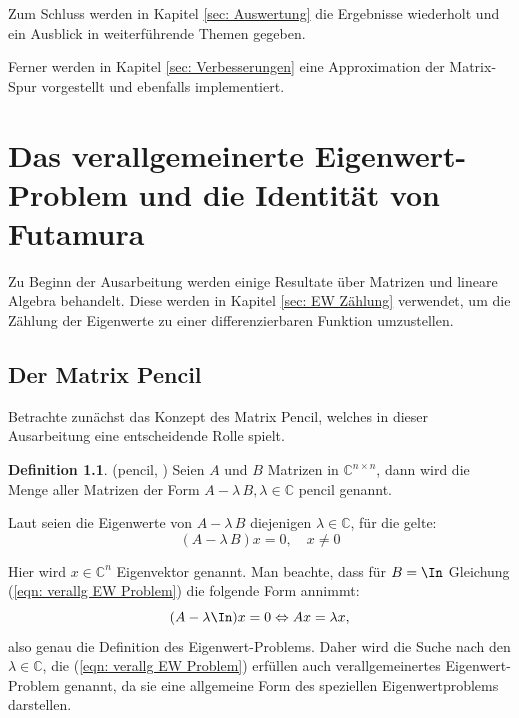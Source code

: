 \documentclass[ngerman,BCOR=4mm]{tudscrreprt}
\newcommand{\C}{\mathbb C}
\newcommand{\AlamB}{A-\lambda\,B}
\theoremstyle{plain} %
\theoremstyle{definition} %
\newtheorem{definition}[theorem]{Definition}
\theoremstyle{remark}
\begin{document}
      Zum Schluss werden in Kapitel \ref{sec: Auswertung} die Ergebnisse wiederholt und ein Ausblick in weiterführende Themen gegeben.

      Ferner werden in Kapitel \ref{sec: Verbesserungen} eine Approximation der Matrix-Spur vorgestellt und ebenfalls implementiert.

\chapter{Das verallgemeinerte Eigenwert-Problem und die Identität von Futamura}
\label{sec: EW Problem_Futamura}

      Zu Beginn der Ausarbeitung werden einige Resultate über Matrizen und lineare Algebra behandelt.
      Diese werden in Kapitel \ref{sec: EW Zählung} verwendet, um die Zählung der Eigenwerte zu einer differenzierbaren Funktion umzustellen.
      
      \section{Der Matrix Pencil}
            Betrachte zunächst das Konzept des Matrix Pencil, welches in dieser Ausarbeitung eine entscheidende Rolle spielt.
            \begin{definition}(pencil, \cite[S. 375]{matrixGolub})
                  \label{def: pencil}
                  Seien $A$ und $B$ Matrizen in $\C^{n\times n}$, dann wird die Menge aller Matrizen der Form
                  $\AlamB, \lambda \in \C$ pencil genannt.
            \end{definition}

            Laut \cite[S. 375]{matrixGolub} seien die Eigenwerte von $\AlamB$ diejenigen $\lambda \in\C$, für die gelte:
            \begin{equation}
                  \label{eqn: verallg EW Problem}
                  (\AlamB)x=0,\quad x\ne 0
            \end{equation}
            
            Hier wird $x\in\C^n$ Eigenvektor genannt.
            Man beachte, dass für $B=\In$ Gleichung (\ref{eqn: verallg EW Problem}) die folgende Form annimmt:
            $$(A-\lambda\In)x=0 \Leftrightarrow Ax = \lambda x,$$
            also genau die Definition des Eigenwert-Problems.
            Daher wird die Suche nach den $\lambda\in\C$, die (\ref{eqn: verallg EW Problem}) erfüllen auch verallgemeinertes Eigenwert-Problem genannt, da sie eine allgemeine Form des speziellen Eigenwertproblems darstellen.
\end{document}
